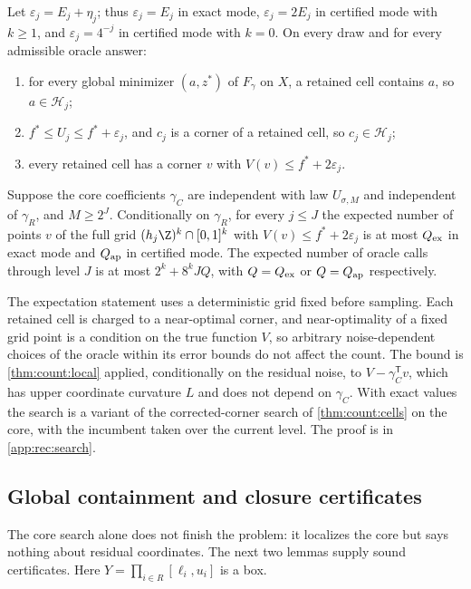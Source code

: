 \begin{proposition}\label{prop:rec:search}
Let $\varepsilon_j=E_j+\eta_j$; thus $\varepsilon_j=E_j$ in exact mode,
$\varepsilon_j=2E_j$ in certified mode with $k\ge1$, and
$\varepsilon_j=4^{-j}$ in certified mode with $k=0$. On every draw and for
every admissible oracle answer:
\begin{enumerate}[label=(\alph*)]
\item for every global minimizer $(a,z^*)$ of $F_\gamma$ on $X$, a retained
cell contains $a$, so $a\in\mathcal H_j$;
\item $f^*\le U_j\le f^*+\varepsilon_j$, and $c_j$ is a corner of a retained
cell, so $c_j\in\mathcal H_j$;
\item every retained cell has a corner $v$ with $V(v)\le f^*+2\varepsilon_j$.
\end{enumerate}
Suppose the core coefficients $\gamma_C$ are independent with law
$U_{\sigma,M}$ and independent of $\gamma_R$, and $M\ge2^J$. Conditionally
on $\gamma_R$, for every $j\le J$ the expected number of points $v$ of the
full grid $(h_j\Z)^k\cap[0,1]^k$ with $V(v)\le f^*+2\varepsilon_j$ is at most
$Q_{\rm ex}$ in exact mode and $Q_{\rm ap}$ in certified mode. The expected
number of oracle calls through level $J$ is at most $2^k+8^kJQ$, with
$Q=Q_{\rm ex}$ or $Q=Q_{\rm ap}$ respectively.
\end{proposition}

The expectation statement uses a deterministic grid fixed before sampling.
Each retained cell is charged to a near-optimal corner, and near-optimality
of a fixed grid point is a condition on the true function $V$, so arbitrary
noise-dependent choices of the oracle within its error bounds do not affect
the count. The bound is \cref{thm:count:local} applied, conditionally on the
residual noise, to $V-\gamma_C^{\mathsf T}v$, which has upper coordinate
curvature $L$ and does not depend on $\gamma_C$. With exact values the search
is a variant of the corrected-corner search of \cref{thm:count:cells} on the
core, with the incumbent taken over the current level. The proof is in
\cref{app:rec:search}.

\subsection{Global containment and closure certificates}\label{sec:rec:certificates}

The core search alone does not finish the problem: it localizes the core but
says nothing about residual coordinates. The next two lemmas supply sound
certificates. Here $Y=\prod_{i\in R}[\ell_i,u_i]$ is a box.

